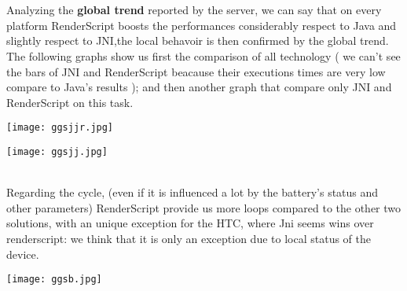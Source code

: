 \documentclass[11pt,english]{article}
\begin{document}
\\\\Analyzing the \textbf{global trend} reported by the server, we can say that on every platform RenderScript boosts the performances considerably respect to Java and slightly respect to JNI,the local behavoir is then confirmed by the global trend.
The following graphs show us first the comparison of all technology ( we can't see the bars of JNI and RenderScript beacause their executions times are very low compare to Java's results ); and then another graph that compare only JNI and RenderScript on this task.
\begin{center}
\texttt{[image: ggsjjr.jpg]}
\end{center} 
\begin{center}
\texttt{[image: ggsjj.jpg]}
\end{center} 
\\Regarding the cycle, (even if it is influenced a lot by the battery's status and other parameters) RenderScript provide us more loops compared to the other two solutions, with an unique exception for the HTC, where Jni seems wins over renderscript: we think that it is only an exception due to local status of the device.
\begin{center}
\texttt{[image: ggsb.jpg]}
\end{center} 
\end{document}
